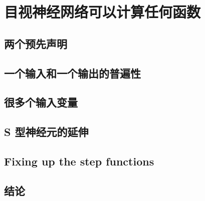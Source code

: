 
\chapter{目视神经网络可以计算任何函数}
\label{ch:VisualProof}

\section{两个预先声明}
\label{sec:two_caveats}

\section{一个输入和一个输出的普遍性}
\label{sec:universality_with_one_input_and_one_output}

\section{很多个输入变量}
\label{sec:many_input_variables}

\section{S 型神经元的延伸}
\label{sec:extension_beyond_sigmoid_neurons}

\section{Fixing up the step functions}
\label{sec:fixing_up_the_step_functions}

\section{结论}
\label{sec:conclusion}
